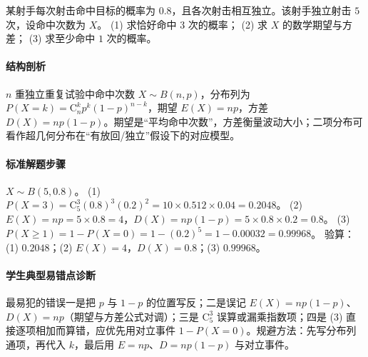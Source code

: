 \begin{problem}
某射手每次射击命中目标的概率为 $0.8$，且各次射击相互独立。该射手独立射击 $5$ 次，设命中次数为 $X$。
(1) 求恰好命中 $3$ 次的概率；
(2) 求 $X$ 的数学期望与方差；
(3) 求至少命中 $1$ 次的概率。
\end{problem}
\begin{solution}
\paragraph{结构剖析}
$n$ 重独立重复试验中命中次数 $X\sim B(n,p)$，分布列为 $P(X=k)=\mathrm{C}_n^kp^k(1-p)^{n-k}$，期望 $E(X)=np$，方差 $D(X)=np(1-p)$。期望是“平均命中次数”，方差衡量波动大小；二项分布可看作超几何分布在“有放回/独立”假设下的对应模型。
\paragraph{标准解题步骤}
$X\sim B(5,0.8)$。
(1) $P(X=3)=\mathrm{C}_5^3(0.8)^3(0.2)^2=10\times0.512\times0.04=0.2048$。
(2) $E(X)=np=5\times0.8=4$，$D(X)=np(1-p)=5\times0.8\times0.2=0.8$。
(3) $P(X\ge1)=1-P(X=0)=1-(0.2)^5=1-0.00032=0.99968$。
验算：(1) $0.2048$；(2) $E(X)=4$，$D(X)=0.8$；(3) $0.99968$。
\paragraph{学生典型易错点诊断}
最易犯的错误一是把 $p$ 与 $1-p$ 的位置写反；二是误记 $E(X)=np(1-p)$、$D(X)=np$（期望与方差公式对调）；三是 $\mathrm{C}_5^3$ 误算或漏乘指数项；四是 (3) 直接逐项相加而算错，应优先用对立事件 $1-P(X=0)$。规避方法：先写分布列通项，再代入 $k$，最后用 $E=np$、$D=np(1-p)$ 与对立事件。
\end{solution}

